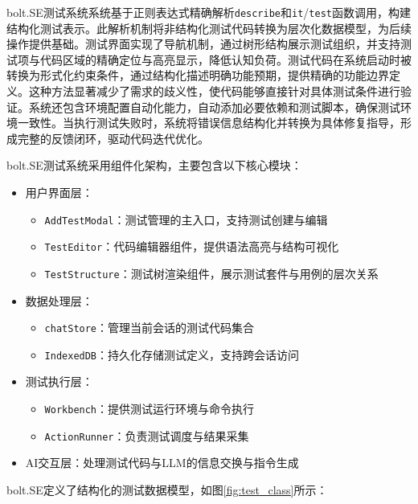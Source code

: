 bolt.SE测试系统系统基于正则表达式精确解析\texttt{describe}和\texttt{it}/\texttt{test}函数调用，构建结构化测试表示。此解析机制将非结构化测试代码转换为层次化数据模型，为后续操作提供基础。测试界面实现了导航机制，通过树形结构展示测试组织，并支持测试项与代码区域的精确定位与高亮显示，降低认知负荷。测试代码在系统启动时被转换为形式化约束条件，通过结构化描述明确功能预期，提供精确的功能边界定义。这种方法显著减少了需求的歧义性，使代码能够直接针对具体测试条件进行验证。系统还包含环境配置自动化能力，自动添加必要依赖和测试脚本，确保测试环境一致性。当执行测试失败时，系统将错误信息结构化并转换为具体修复指导，形成完整的反馈闭环，驱动代码迭代优化。

bolt.SE测试系统采用组件化架构，主要包含以下核心模块：

\begin{itemize}
  \item 用户界面层：
    \begin{itemize}
      \item \texttt{AddTestModal}：测试管理的主入口，支持测试创建与编辑
      \item \texttt{TestEditor}：代码编辑器组件，提供语法高亮与结构可视化
      \item \texttt{TestStructure}：测试树渲染组件，展示测试套件与用例的层次关系
    \end{itemize}
  
  \item 数据处理层：
    \begin{itemize}
      \item \texttt{chatStore}：管理当前会话的测试代码集合
      \item \texttt{IndexedDB}：持久化存储测试定义，支持跨会话访问
    \end{itemize}
  
  \item 测试执行层：
    \begin{itemize}
      \item \texttt{Workbench}：提供测试运行环境与命令执行
      \item \texttt{ActionRunner}：负责测试调度与结果采集
    \end{itemize}
  
  \item AI交互层：处理测试代码与LLM的信息交换与指令生成
\end{itemize}

bolt.SE定义了结构化的测试数据模型，如图\ref{fig:test_class}所示：

